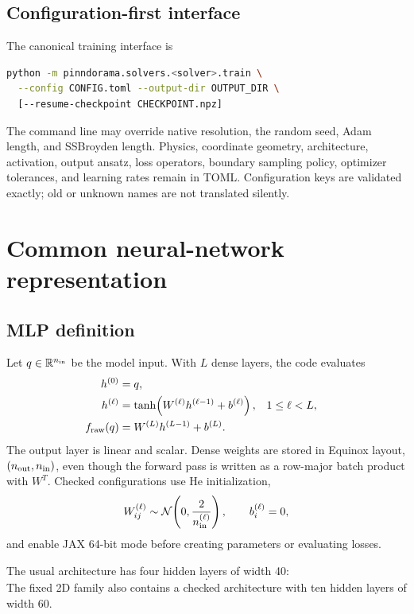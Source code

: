 \documentclass[11pt]{article}
\newcommand{\code}[1]{\texttt{\detokenize{#1}}}
\begin{document}
\subsection{Configuration-first interface}

The canonical training interface is

\begin{lstlisting}[language=bash]
python -m pinndorama.solvers.<solver>.train \
  --config CONFIG.toml --output-dir OUTPUT_DIR \
  [--resume-checkpoint CHECKPOINT.npz]
\end{lstlisting}

The command line may override native resolution, the random seed, Adam
length, and SSBroyden length.  Physics, coordinate geometry, architecture,
activation, output ansatz, loss operators, boundary sampling policy,
optimizer tolerances, and learning rates remain in TOML.  Configuration keys
are validated exactly; old or unknown names are not translated silently.

\section{Common neural-network representation}

\subsection{MLP definition}

Let $q\in\mathbb{R}^{n_{\rm in}}$ be the model input.  With $L$ dense layers,
the code evaluates
\begin{align}
  h^{(0)} &= q,\\
  h^{(\ell)} &= \tanh\!\left(W^{(\ell)}h^{(\ell-1)}+b^{(\ell)}\right),
       &&1\leq \ell<L,\\
  f_{\rm raw}(q) &= W^{(L)}h^{(L-1)}+b^{(L)}.
\end{align}
The output layer is linear and scalar.  Dense weights are stored in Equinox
layout, $(n_{\rm out},n_{\rm in})$, even though the forward pass is written
as a row-major batch product with $W^{T}$.  Checked configurations use He
initialization,
\begin{equation}
  W_{ij}^{(\ell)}\sim
  \mathcal{N}\!\left(0,\frac{2}{n_{\rm in}^{(\ell)}}\right),
  \qquad b_i^{(\ell)}=0,
\end{equation}
and enable JAX 64-bit mode before creating parameters or evaluating losses.

The usual \code{w40d4} architecture has four hidden layers of width 40:
\begin{equation}
  [n_{\rm in},40,40,40,40,1].
\end{equation}
The fixed 2D family also contains a checked \code{w60d10} architecture with
ten hidden layers of width 60.
\end{document}
